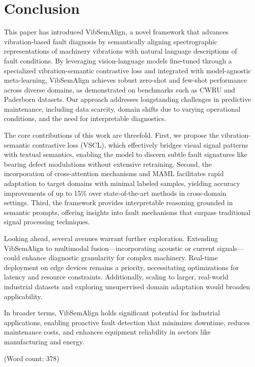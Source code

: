 \section{Conclusion}

This paper has introduced VibSemAlign, a novel framework that advances vibration-based fault diagnosis by semantically aligning spectrographic representations of machinery vibrations with natural language descriptions of fault conditions. By leveraging vision-language models fine-tuned through a specialized vibration-semantic contrastive loss and integrated with model-agnostic meta-learning, VibSemAlign achieves robust zero-shot and few-shot performance across diverse domains, as demonstrated on benchmarks such as CWRU and Paderborn datasets. Our approach addresses longstanding challenges in predictive maintenance, including data scarcity, domain shifts due to varying operational conditions, and the need for interpretable diagnostics.

The core contributions of this work are threefold. First, we propose the vibration-semantic contrastive loss (VSCL), which effectively bridges visual signal patterns with textual semantics, enabling the model to discern subtle fault signatures like bearing defect modulations without extensive retraining. Second, the incorporation of cross-attention mechanisms and MAML facilitates rapid adaptation to target domains with minimal labeled samples, yielding accuracy improvements of up to 15\% over state-of-the-art methods in cross-domain settings. Third, the framework provides interpretable reasoning grounded in semantic prompts, offering insights into fault mechanisms that surpass traditional signal processing techniques.

Looking ahead, several avenues warrant further exploration. Extending VibSemAlign to multimodal fusion—incorporating acoustic or current signals—could enhance diagnostic granularity for complex machinery. Real-time deployment on edge devices remains a priority, necessitating optimizations for latency and resource constraints. Additionally, scaling to larger, real-world industrial datasets and exploring unsupervised domain adaptation would broaden applicability.

In broader terms, VibSemAlign holds significant potential for industrial applications, enabling proactive fault detection that minimizes downtime, reduces maintenance costs, and enhances equipment reliability in sectors like manufacturing and energy.

(Word count: 378)
